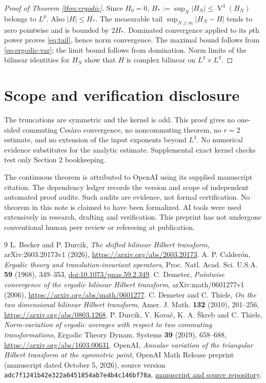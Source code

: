 \documentclass[11pt]{article}
\DeclareMathOperator{\Var}{V}
\begin{document}
\begin{proof}[Proof of Theorem \ref{thm:ergodic}]
Since $H_0=0$, $H_*:=\sup_N|H_N|\le\Var^3(H_N)$ belongs to $L^p$.
Also $|H|\le H_*$. The measurable tail
$\sup_{N\ge m}|H_N-H|$ tends to zero pointwise and is bounded by
$2H_*$. Dominated convergence applied to its $p$th power proves
\eqref{eq:tail}, hence norm convergence. The maximal bound follows
from \eqref{eq:ergodic-var}; the limit bound follows from domination.
Norm limits of the bilinear identities for $H_N$ show that $H$ is
complex bilinear on $L^3\times L^3$.
\end{proof}

\section{Scope and verification disclosure}
The truncations are symmetric and the kernel is odd. This proof gives
no one-sided commuting Ces\`aro convergence, no noncommuting theorem,
no $r=2$ estimate, and no extension of the input exponents beyond $L^3$.
No numerical evidence substitutes for the analytic estimate.
Supplemental exact kernel checks test only Section 2 bookkeeping.

The continuous theorem is attributed to OpenAI using its supplied
manuscript citation. The dependency ledger records the version and
scope of independent automated proof audits. Such audits are evidence,
not formal certification. No theorem in this note is claimed to have
been formalized. AI tools were used extensively in research, drafting
and verification. This preprint has not undergone conventional human
peer review or refereeing at publication.

\begin{thebibliography}{9}
 L. Becker and P. Durcik,
\emph{The shifted bilinear Hilbert transform}, arXiv:2603.20173v1 (2026),
\url{https://arxiv.org/abs/2603.20173}.
 A. P. Calder\'on,
\emph{Ergodic theory and translation-invariant operators},
Proc. Natl. Acad. Sci. U.S.A. \textbf{59} (1968), 349--353,
\href{https://doi.org/10.1073/pnas.59.2.349}{doi:10.1073/pnas.59.2.349}.
 C. Demeter,
\emph{Pointwise convergence of the ergodic bilinear Hilbert transform},
arXiv:math/0601277v1 (2006),
\url{https://arxiv.org/abs/math/0601277}.
 C. Demeter and C. Thiele,
\emph{On the two dimensional bilinear Hilbert transform},
Amer. J. Math. \textbf{132} (2010), 201--256,
\url{https://arxiv.org/abs/0803.1268}.
 P. Durcik, V. Kova\v{c}, K. A. \v{S}kreb and C. Thiele,
\emph{Norm-variation of ergodic averages with respect to two commuting
transformations}, Ergodic Theory Dynam. Systems \textbf{39} (2019),
658--688, \url{https://arxiv.org/abs/1603.00631}.
 OpenAI,
\emph{Annular variation of the triangular Hilbert transform at the
symmetric point}, OpenAI Math Release preprint (manuscript dated
October 5, 2026), source version
\texttt{adc7f1241b42e322a6451854ab7e4b4c146bf78a},
\href{https://github.com/openai/math/blob/adc7f1241b42e322a6451854ab7e4b4c146bf78a/preprints/Annular-variation-of-the-triangular-Hilbert-transform-at-the-symmetric-point-October-5-2026/annular-variation.pdf}{manuscript and source repository}.
\end{thebibliography}
\end{document}
